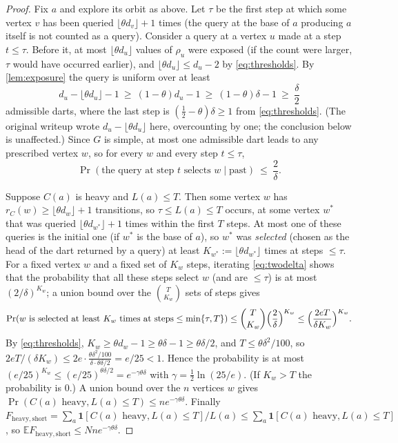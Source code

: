 \documentclass[11pt,a4paper]{article}
\theoremstyle{plain}
\theoremstyle{definition}
\theoremstyle{remark}
\newcommand{\E}{\mathbb E}
\newcommand{\ind}{\mathbf 1}
\newcommand{\Fheavy}{F_{\mathrm{heavy,short}}}
\begin{document}
\label{pf:heavy}
\lemheavy*
\begin{proof}
Fix $a$ and explore its orbit as above. Let $\tau$ be the first step at which some vertex $v$ has been queried $\lfloor\theta d_v\rfloor+1$ times (the query at the base of $a$ producing $a$ itself is not counted as a query). Consider a query at a vertex $u$ made at a step $t\le\tau$. Before it, at most $\lfloor\theta d_u\rfloor$ values of $\rho_u$ were exposed (if the count were larger, $\tau$ would have occurred earlier), and $\lfloor\theta d_u\rfloor\le d_u-2$ by \eqref{eq:thresholds}. By \cref{lem:exposure} the query is uniform over at least
\[
 d_u-\lfloor\theta d_u\rfloor-1\ \ge\ (1-\theta)d_u-1\ \ge\ (1-\theta)\delta-1\ \ge\ \frac\delta2
\]
admissible darts, where the last step is $(\tfrac12-\theta)\delta\ge1$ from \eqref{eq:thresholds}. (The original writeup wrote $d_u-\lfloor\theta d_u\rfloor$ here, overcounting by one; the conclusion below is unaffected.) Since $G$ is simple, at most one admissible dart leads to any prescribed vertex $w$, so for every $w$ and every step $t\le\tau$,
\begin{equation}\label{eq:twodelta}
 \Pr(\text{the query at step }t\text{ selects }w\mid\text{past})\ \le\ \frac2\delta .
\end{equation}

Suppose $C(a)$ is heavy and $L(a)\le T$. Then some vertex $w$ has $r_{C}(w)\ge\lfloor\theta d_w\rfloor+1$ transitions, so $\tau\le L(a)\le T$ occurs, at some vertex $w^*$ that was queried $\lfloor\theta d_{w^*}\rfloor+1$ times within the first $T$ steps. At most one of these queries is the initial one (if $w^*$ is the base of $a$), so $w^*$ was \emph{selected} (chosen as the head of the dart returned by a query) at least $K_{w^*}:=\lfloor\theta d_{w^*}\rfloor$ times at steps $\le\tau$. For a fixed vertex $w$ and a fixed set of $K_w$ steps, iterating \eqref{eq:twodelta} shows that the probability that all these steps select $w$ (and are $\le\tau$) is at most $(2/\delta)^{K_w}$; a union bound over the $\binom T{K_w}$ sets of steps gives
\[
 \Pr(w\text{ is selected at least }K_w\text{ times at steps}\le\min\{\tau,T\})\le\binom T{K_w}\Bigl(\frac2\delta\Bigr)^{K_w}\le\Bigl(\frac{2eT}{\delta K_w}\Bigr)^{K_w}.
\]
By \eqref{eq:thresholds}, $K_w\ge\theta d_w-1\ge\theta\delta-1\ge\theta\delta/2$, and $T\le\theta\delta^2/100$, so $2eT/(\delta K_w)\le2e\cdot\frac{\theta\delta^2/100}{\delta\cdot\theta\delta/2}=e/25<1$. Hence the probability is at most $(e/25)^{K_w}\le(e/25)^{\theta\delta/2}=e^{-\gamma\theta\delta}$ with $\gamma=\tfrac12\ln(25/e)$. (If $K_w>T$ the probability is $0$.) A union bound over the $n$ vertices $w$ gives $\Pr(C(a)\text{ heavy},L(a)\le T)\le ne^{-\gamma\theta\delta}$. Finally $\Fheavy=\sum_a\ind[C(a)\text{ heavy},L(a)\le T]/L(a)\le\sum_a\ind[C(a)\text{ heavy},L(a)\le T]$, so $\E\Fheavy\le Nne^{-\gamma\theta\delta}$.
\end{proof}
\end{document}
